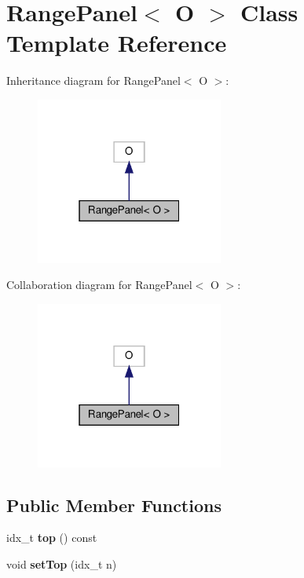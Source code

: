 \hypertarget{classRangePanel}{}\section{Range\+Panel$<$ O $>$ Class Template Reference}
\label{classRangePanel}


Inheritance diagram for Range\+Panel$<$ O $>$\+:\nopagebreak
\begin{figure}[H]
\begin{center}
\leavevmode
\includegraphics[width=175pt]{classRangePanel__inherit__graph}
\end{center}
\end{figure}


Collaboration diagram for Range\+Panel$<$ O $>$\+:\nopagebreak
\begin{figure}[H]
\begin{center}
\leavevmode
\includegraphics[width=175pt]{classRangePanel__coll__graph}
\end{center}
\end{figure}
\subsection*{Public Member Functions}
\begin{DoxyCompactItemize}
\item 
\mbox{\label{classRangePanel_a6e9afb303bbe3f59bbc82363aa9642f9}} 
idx\+\_\+t {\bfseries top} () const
\item 
\mbox{\label{classRangePanel_aecc0841ba198f660e898f7c6e03f1aca}} 
void {\bfseries set\+Top} (idx\+\_\+t n)
\end{DoxyCompactItemize}
